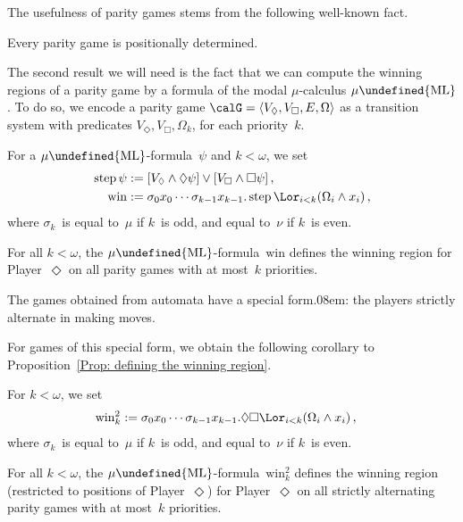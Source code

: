 \documentclass[10pt, fleqn]{scrartcl}
\makeatletter
\newcommand\m@thsm@ller[2]{\mbox{\relscale{0.91}$\m@th#1#2$}}
\let\smaller\undefined
\DeclareRobustCommand\smaller[1]{\relax\ifmmode{\mathpalette\m@thsm@ller{#1}}\else{\relscale{0.91}#1}\fi}
\DeclareRobustCommand*{\step}{\qopname\relax o{step}}
\newcommand*{\ML}{\smaller{\mathrm{ML}}}
\newcommand*{\?}{\kern .08em}
\newcommand\upqed{\vskip-\baselineskip\vskip-\belowdisplayskip}
\makeatother
\begin{document}
The usefulness of parity games stems from the following well-known fact.
\begin{Thm}
Every parity game is positionally determined.
\end{Thm}

The second result we will need is the fact that we can compute the winning regions of a parity
game by a formula of the modal $\mu$-calculus $\mu\ML$.
To do so, we encode a parity game $\calG = \langle V_\Diamond,V_\Box,E,\Omega\rangle$
as a transition system with predicates $V_\Diamond,V_\Box,\Omega_k$, for each priority~$k$.
\begin{Def}
For a $\mu\ML$-formula~$\psi$ and $k < \omega$, we set
\begin{align*}
  \step \psi      &:= [V_\Diamond \land \Diamond\psi] \lor [V_\Box \land \Box\psi]\,, \\
  \mathrm{win}    &:= \sigma_0x_0\cdots\sigma_{k-1}x_{k-1}.
                        \step \Lor_{i<k}(\Omega_i \land x_i)\,,
\end{align*}
where $\sigma_k$~is equal to~$\mu$ if $k$~is odd, and equal to~$\nu$ if $k$~is even.
\end{Def}
\begin{Prop}\label{Prop: defining the winning region}
For all $k < \omega$, the $\mu\ML$-formula~$\mathrm{win}$ defines the winning region
for Player~$\Diamond$ on all parity games with at most~$k$ priorities.
\end{Prop}

The games obtained from automata have a special form\?: the players strictly alternate in making
moves.

For games of this special form, we obtain the following corollary to
Proposition~\ref{Prop: defining the winning region}.
\begin{Def}
For $k < \omega$, we set
\begin{align*}
  \mathrm{win}^2_k      &:= \sigma_0x_0\cdots\sigma_{k-1}x_{k-1}.
                              {\Diamond}{\Box} \Lor_{i<k}(\Omega_i \land x_i)\,,
\end{align*}
where $\sigma_k$~is equal to~$\mu$ if $k$~is odd, and equal to~$\nu$ if $k$~is even.
\end{Def}
\begin{Cor}\label{Cor: defining the winning region of a strictly alternating game}
For all $k < \omega$, the $\mu\ML$-formula~$\mathrm{win}^2_k$ defines the winning region
(restricted to positions of Player~$\Diamond$)
for Player~$\Diamond$ on all strictly alternating parity games with at most~$k$ priorities.
\end{Cor}
\end{document}
